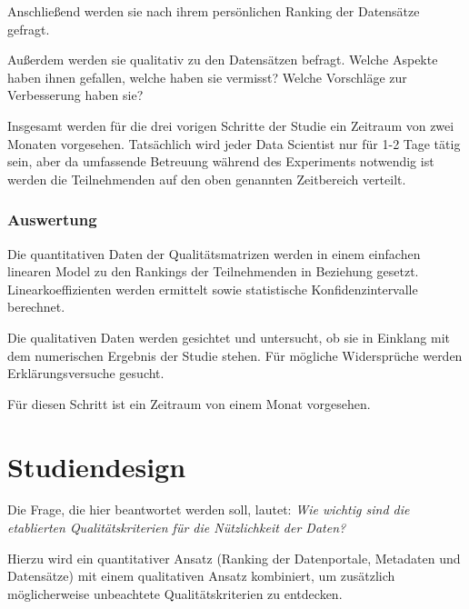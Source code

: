 \documentclass[a4paper,10pt,german,public]{INSOexpose}
\begin{document}
Anschließend werden sie nach ihrem persönlichen Ranking der Datensätze
gefragt.

Außerdem werden sie qualitativ zu den Datensätzen
befragt. Welche Aspekte haben ihnen gefallen, welche haben sie vermisst?
Welche Vorschläge zur Verbesserung haben sie?
 
Insgesamt werden für die drei vorigen Schritte der Studie
ein Zeitraum von zwei Monaten vorgesehen.
Tatsächlich wird jeder Data Scientist nur für 1-2 Tage tätig sein,
aber da umfassende Betreuung während des Experiments notwendig
ist werden die Teilnehmenden auf den oben genannten Zeitbereich
verteilt.

\subsubsection{Auswertung}

Die quantitativen Daten der Qualitätsmatrizen werden in einem einfachen
linearen Model zu den Rankings der Teilnehmenden in Beziehung gesetzt.
Linearkoeffizienten werden ermittelt sowie statistische Konfidenzintervalle
berechnet.

Die qualitativen Daten werden gesichtet und untersucht, ob sie in
Einklang mit dem numerischen Ergebnis der Studie stehen.
Für mögliche Widersprüche werden Erklärungsversuche gesucht.

Für diesen Schritt ist ein Zeitraum von einem Monat vorgesehen.

\section{Studiendesign}


Die Frage, die hier beantwortet werden soll, lautet:
\emph{\glqq{}Wie wichtig sind die etablierten Qualitätskriterien für die Nützlichkeit der Daten?\grqq}

Hierzu wird ein quantitativer Ansatz (Ranking der Datenportale,
Metadaten und Datensätze) mit einem qualitativen Ansatz
kombiniert, um zusätzlich möglicherweise unbeachtete
Qualitätskriterien zu entdecken.
\end{document}
